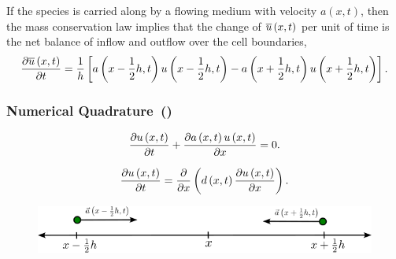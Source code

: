 \begin{frame}
    \begin{theorem}
        If the species is carried along by a flowing medium with
        velocity
        \begin{math}
            a\left(x,t\right)
        \end{math},
        then the mass conservation law
        implies that the change of
        \begin{math}
            \overline{u}\left(x,t\right)
        \end{math}
        per
        unit of time is the net balance of inflow and outflow over
        the cell boundaries,
        \begin{equation*}
            \diffp{\averageconcentration}{t}=
            \dfrac{1}{h}
            \left[
                a
                \left(
                x-\frac{1}{2}h,t
                \right)
                u
                \left(
                x-\frac{1}{2}h,t
                \right)-
                a
                \left(
                x+\frac{1}{2}h,t
                \right)
                u
                \left(
                x+\frac{1}{2}h,t
                \right)
                \right].
        \end{equation*}
    \end{theorem}
\end{frame}

\begin{frame}
    \frametitle{Numerical Quadrature~(\citeauthor[p.~9]{Hundsdorfer2003})}

    \begin{definition}
        \begin{equation*}
            \diffp{\concentration}{t}+
            \diffp{a\left(x,t\right)\concentration}{x}=
            0.
        \end{equation*}
    \end{definition}

    \begin{definition}
        \begin{equation*}
            \diffp{\concentration}{t}=
            \diffp{}{x}
            \left(
            d\left(x,t\right)\diffp{\concentration}{x}
            \right).
        \end{equation*}
    \end{definition}

    \begin{figure}[ht!]
        \centering
        \includegraphics[width=.6\paperwidth]{deduction}
    \end{figure}
\end{frame}

